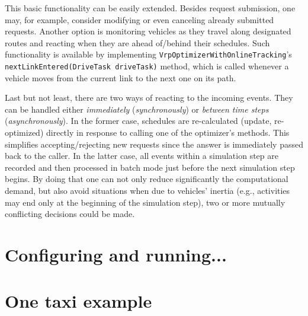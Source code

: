 This basic functionality can be easily extended. Besides request submission, one may, for example, consider modifying or even canceling already submitted requests. Another option is monitoring vehicles as they travel along designated routes and reacting when they are ahead of/behind their schedules. Such functionality is available by implementing \lstinline$VrpOptimizerWithOnlineTracking$'s \lstinline$nextLinkEntered(DriveTask driveTask)$ method, which is called whenever a vehicle moves from the current link to the next one on its path.

Last but not least, there are two ways of reacting to the incoming events. They can be handled either \emph{immediately} (\emph{synchronously}) or \emph{between time steps} (\emph{asynchronously}). In the former case, schedules are re-calculated (update, re-optimized) directly in response to calling one of the optimizer's methods. This simplifies accepting/rejecting new requests since the answer is immediately passed back to the caller. In the latter case, all events within a simulation step are recorded and then processed in batch mode just before the next simulation step begins. By doing that one can not only reduce significantly the computational demand, but also avoid situations when due to vehicles' inertia (e.g., activities may end only at the beginning of the simulation step), two or more mutually conflicting decisions could be made.


\section{Configuring and running...}


\section{One taxi example}

